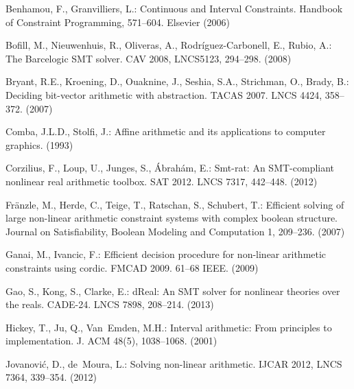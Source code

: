 \documentclass[runningheads,a4paper,oribibl]{llncs}
\begin{document}



\begin{thebibliography}{10}
\providecommand{\url}[1]{\texttt{#1}}
\providecommand{\urlprefix}{URL }

  Benhamou, F., Granvilliers, L.: {Continuous and Interval Constraints}.
  {Handbook of Constraint Programming}, 571--604. {Elsevier} (2006)

Bofill, M., Nieuwenhuis, R., Oliveras, A., Rodríguez-Carbonell, E., Rubio, A.:
The Barcelogic SMT solver.
CAV 2008, LNCS5123, 294--298. (2008)

Bryant, R.E., Kroening, D., Ouaknine, J., Seshia, S.A., Strichman, O., Brady,
B.: Deciding bit-vector arithmetic with abstraction.
TACAS 2007. 
LNCS 4424,  358--372. (2007)

Comba, J.L.D., Stolfi, J.: Affine arithmetic and its applications to computer
graphics. (1993)

  Corzilius, F., Loup, U., Junges, S., Ábrahám, E.: Smt-rat:
  An SMT-compliant nonlinear real arithmetic toolbox.
SAT 2012. LNCS 7317,  442--448. (2012)

Fränzle, M., Herde, C., Teige, T., Ratschan, S., Schubert, T.: Efficient
  solving of large non-linear arithmetic constraint systems with complex
  boolean structure. Journal on Satisfiability, Boolean Modeling and
  Computation  1,  209--236. (2007)

Ganai, M., Ivancic, F.: Efficient decision procedure for non-linear arithmetic
constraints using cordic.
FMCAD 2009.  61--68 {IEEE}. (2009)

  Gao, S., Kong, S., Clarke, E.:
  dReal: An SMT solver for nonlinear theories over the reals.
CADE-24. LNCS 7898,  208--214. (2013)

  Hickey, T., Ju, Q., Van~Emden, M.H.:
  Interval arithmetic: From principles to implementation.
  J. ACM  48(5),  1038--1068. (2001)

  Jovanović, D., de~Moura, L.: Solving non-linear arithmetic.
  IJCAR 2012, LNCS 7364,  339--354. (2012)


\end{thebibliography}
\end{document}
